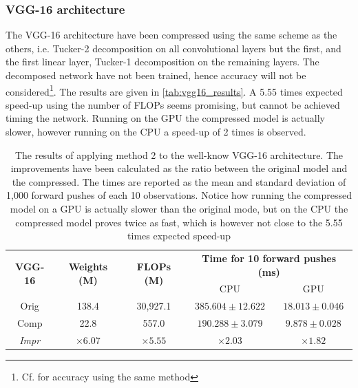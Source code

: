 \subsubsection{VGG-16 architecture}
The VGG-16 architecture have been compressed using the same scheme as the others, i.e. Tucker-2 decomposition on all convolutional layers but the first, and the first linear layer, Tucker-1 decomposition on the remaining layers. The decomposed network have not been trained, hence accuracy will not be considered\footnote{Cf. \cite{Kim2016} for accuracy using the same method}. The results are given in \autoref{tab:vgg16_results}. A 5.55 times expected speed-up using the number of FLOPs seems promising, but cannot be achieved timing the network. Running on the GPU the compressed model is actually slower, however running on the CPU a speed-up of 2 times is observed.
\begin{table}[H]
\centering
\captionsetup{width=.95\linewidth}
\caption{The results of applying method 2 to the well-know VGG-16 architecture. The improvements have been calculated as the ratio between the original model and the compressed. The times are reported as the mean and standard deviation of 1,000 forward pushes of each 10 observations. Notice how running the compressed model on a GPU is actually slower than the original mode, but on the CPU the compressed model proves twice as fast, which is however not close to the 5.55 times expected speed-up}
\label{tab:vgg16_results}
\begin{tabular}{c|cccc}
\multirow{2}{*}{\textbf{VGG-16}} & \multirow{2}{*}{\textbf{Weights (M)}} & \multirow{2}{*}{\textbf{FLOPs (M)}} & \multicolumn{2}{c}{\textbf{Time for 10 forward pushes (ms)}} \\
                                 &                                       &                                     & CPU                          & GPU                        \\ \hline
Orig                             & 138.4                                 & 30,927.1                            & $385.604 \pm 12.622 $        & $18.013 \pm 0.046 $        \\
Comp                             & 22.8                                  & 557.0                               & $ 190.288 \pm 3.079 $        & $ 9.878 \pm 0.028 $        \\
\textit{Impr}                    & $ \times 6.07 $                       & $\times 5.55$                       & $\times 2.03 $               & $ \times 1.82 $           
\end{tabular}
\end{table}


